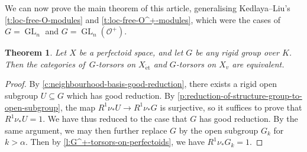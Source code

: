\documentclass[10pt,a4paper]{article}
\newtheorem{Theorem}[thm]{Theorem}
\theoremstyle{definition}
\theoremstyle{remark}
\renewcommand{\O}{\mathcal{O}}
\newcommand{\GL}{\operatorname{GL}}
\newcommand{\et}{{\operatorname{\acute{e}t}}}
\numberwithin{equation}{section}
\begin{document}
We can now prove the main theorem of this article, generalising Kedlaya--Liu's \cref{t:loc-free-O-modules} and
\cref{t:loc-free-O^+-modules}, which were the cases of $G=\GL_n$ and $G=\GL_n(\O^+)$. 


\begin{Theorem}\label{t:G-torsors-on-perfectoids}
	Let $X$ be a perfectoid space, and let $G$ be any rigid group over $K$. Then the categories of\, $G$-torsors on $X_{\et}$ and $G$-torsors on $X_{v}$ are equivalent.
\end{Theorem}

\begin{proof}
	By \cref{c:neighbourhood-basis-good-reduction}, there exists a rigid open subgroup $U\subseteq G$ which has good reduction. By \cref{p:reduction-of-structure-group-to-open-subgroup}, the map
	$R^1\nu_{\ast}U\to R^1\nu_{\ast}G$
	is surjective, so it suffices to prove that $R^1\nu_{\ast}U=1$. 
	We have thus reduced to the case that $G$ has good reduction. By the same argument, we may then further replace $G$ by the open subgroup $G_k$ for $k>\alpha$. Then by \cref{l:G^+-torsors-on-perfectoids}, we have $R^1\nu_{\ast}G_k=1$.
\end{proof}
\end{document}
